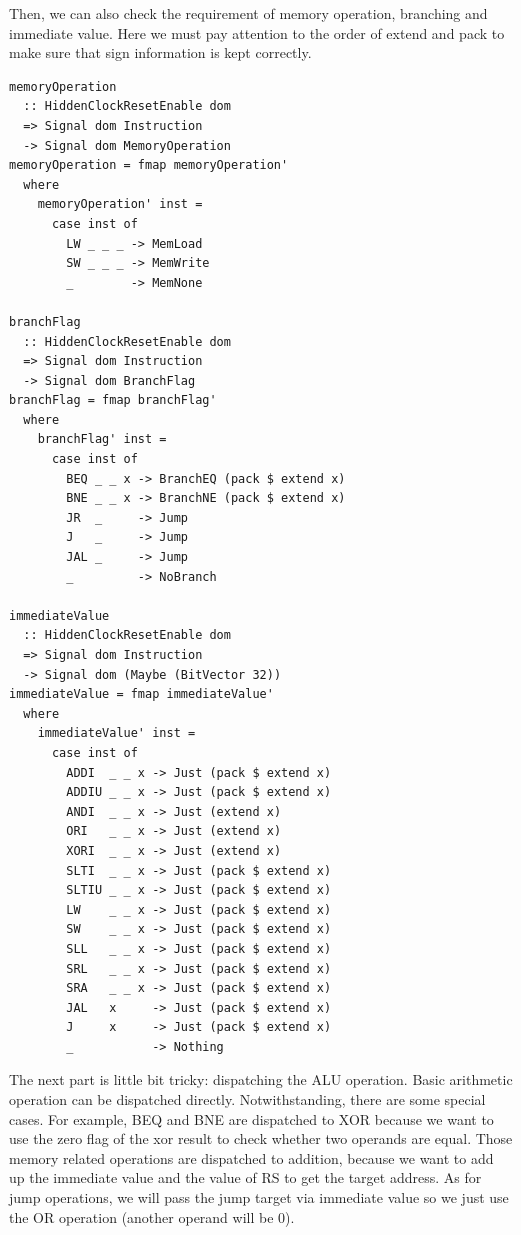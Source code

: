 \documentclass[a4paper,12pt, oneside]{book}
\begin{document}
Then, we can also check the requirement of memory operation, branching and immediate value. Here we must pay attention to the order of extend and pack to make sure that sign information is kept correctly.
\begin{verbatim}
memoryOperation 
  :: HiddenClockResetEnable dom
  => Signal dom Instruction
  -> Signal dom MemoryOperation
memoryOperation = fmap memoryOperation'
  where
    memoryOperation' inst =
      case inst of
        LW _ _ _ -> MemLoad
        SW _ _ _ -> MemWrite
        _        -> MemNone

branchFlag 
  :: HiddenClockResetEnable dom
  => Signal dom Instruction
  -> Signal dom BranchFlag
branchFlag = fmap branchFlag'
  where
    branchFlag' inst =
      case inst of
        BEQ _ _ x -> BranchEQ (pack $ extend x)
        BNE _ _ x -> BranchNE (pack $ extend x)
        JR  _     -> Jump
        J   _     -> Jump
        JAL _     -> Jump
        _         -> NoBranch

immediateValue 
  :: HiddenClockResetEnable dom
  => Signal dom Instruction
  -> Signal dom (Maybe (BitVector 32))
immediateValue = fmap immediateValue'
  where
    immediateValue' inst =
      case inst of
        ADDI  _ _ x -> Just (pack $ extend x)
        ADDIU _ _ x -> Just (pack $ extend x)
        ANDI  _ _ x -> Just (extend x)
        ORI   _ _ x -> Just (extend x)
        XORI  _ _ x -> Just (extend x)
        SLTI  _ _ x -> Just (pack $ extend x)
        SLTIU _ _ x -> Just (pack $ extend x)
        LW    _ _ x -> Just (pack $ extend x)
        SW    _ _ x -> Just (pack $ extend x)
        SLL   _ _ x -> Just (pack $ extend x)
        SRL   _ _ x -> Just (pack $ extend x)
        SRA   _ _ x -> Just (pack $ extend x)
        JAL   x     -> Just (pack $ extend x)
        J     x     -> Just (pack $ extend x)
        _           -> Nothing
\end{verbatim}
The next part is little bit tricky: dispatching the ALU operation. Basic arithmetic operation can be dispatched directly. Notwithstanding, there are some special cases. For example, BEQ and BNE are dispatched to XOR because we want to use the zero flag of the xor result to check whether two operands are equal. Those memory related operations are dispatched to addition, because we want to add up the immediate value and the value of RS to get the target address. As for jump operations, we will pass the jump target via immediate value so we just use the OR operation (another operand will be 0).  
\end{document}
